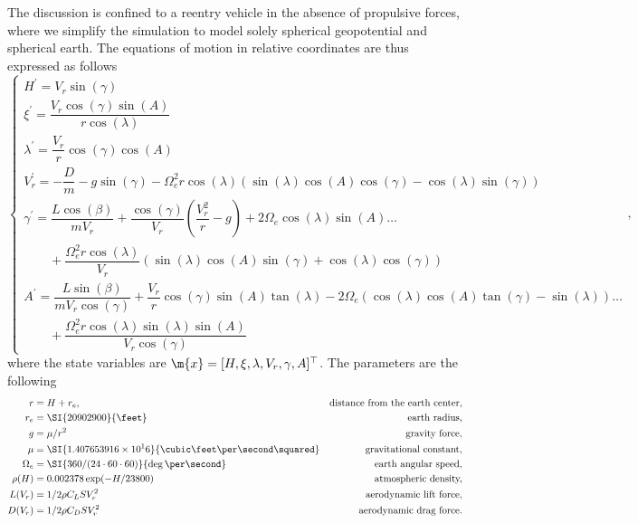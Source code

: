 The discussion is confined to a reentry vehicle in the absence of propulsive forces, where we simplify the simulation to model solely spherical geopotential and spherical earth. The equations of motion in relative coordinates are thus expressed as follows
%
\begin{equation}
  \begin{cases}
  H^{\prime}       = V_r\sin(\gamma) \\
  \xi^{\prime}     = \dfrac{V_r\cos(\gamma) \sin(A)}{r \cos(\lambda)} \\
  \lambda^{\prime} = \dfrac{V_r}{r} \cos(\gamma) \cos(A) \\
  V_r^{\prime}     = -\dfrac{D}{m} - g\sin(\gamma) - \Omega_e^2 r \cos(\lambda)(\sin(\lambda) \cos(A) \cos(\gamma)-\cos(\lambda) \sin(\gamma)) \\
  \gamma^{\prime}  = \dfrac{L\cos(\beta)}{m V_r}+\dfrac{\cos(\gamma)}{V_r}\left(\dfrac{V_r^2}{r}-g\right) + 2\Omega_e \cos(\lambda) \sin(A)\dots \\
  \qquad + \dfrac{\Omega_e^2 r \cos(\lambda)}{V_r}(\sin(\lambda) \cos(A) \sin(\gamma)+\cos(\lambda) \cos(\gamma)) \\
  A^{\prime}       = \dfrac{L\sin(\beta)}{m V_r \cos(\gamma)}+\dfrac{V_r}{r} \cos(\gamma) \sin(A) \tan(\lambda) - 2\Omega_e(\cos(\lambda) \cos(A) \tan(\gamma) - \sin(\lambda)) \dots \\
  \qquad + \dfrac{\Omega_e^2 r \cos(\lambda) \sin(\lambda) \sin(A)}{V_r \cos(\gamma)}
  \end{cases} \text{,}
  \label{chap4:eq:space_shuttle_reentry}
\end{equation}
%
where the state variables are $\m{x} = [H, \xi, \lambda, V_r, \gamma, A]^\top$. The parameters are the following
%
\begin{equation*}
  \begin{aligned}
    r           & = H + r_e, & \text{distance from the earth center,} \\
    r_e         & = \SI{20902900}{\feet} & \text{earth radius,} \\
    g           & = \mu/r^2 & \text{gravity force,} \\
    \mu         & = \SI{1.407653916\times 10^16}{\cubic\feet\per\second\squared} & \text{gravitational constant,} \\
    \Omega_e    & = \SI{360/(24\cdot60\cdot60)}{\deg\per\second} & \text{earth angular speed,} \\
    \rho(H)     & = 0.002378\exp(-H/23800) & \text{atmospheric density,} \\
    L(V_r)      & = 1/2 \rho C_L S V_r^2 & \text{aerodynamic lift force,} \\
    D(V_r)      & = 1/2 \rho C_D S V_r^2 & \text{aerodynamic drag force.}
  \end{aligned}
\end{equation*}
